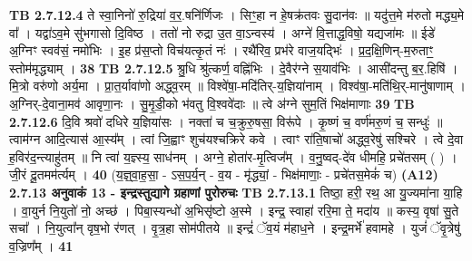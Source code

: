 \documentclass[17pt]{extarticle}
\begin{document}
{                  \newline
                                \textbf{ TB 2.7.12.4} \newline
                  ते स्वा॒निनो॑ रु॒द्रिया॑ व॒र॒.षनि॑र्णिजः । सिꣳ॒॒हा न हे॒षक्र॑तवः सु॒दान॑वः ॥ यदु॑त्त॒मे म॑रुतो मद्ध्य॒मे वा᳚ । यद्वा॑ऽव॒मे सु॑भगासो दि॒विष्ठ । ततो॑ नो रुद्रा उ॒त वा॒ऽन्वस्य॑ । अग्ने॑ वि॒त्ताद्ध॒विषो॒ यद्यजा॑मः ॥ ईडे॑ अ॒ग्निꣳ स्वव॑सं॒ नमो॑भिः । इ॒ह प्र॑स॒प्तो विच॑यत्कृ॒तं नः॑ । रथै॑रिव॒ प्रभ॑रे वाज॒यद्भिः॑ । प्र॒द॒क्षि॒णिन्-म॒रुताꣳ॒॒ स्तोम॑मृद्ध्याम् । \textbf{ 38} \newline
                  \newline
                                \textbf{ TB 2.7.12.5} \newline
                  श्रु॒धि श्रु॑त्कर्ण॒ वह्नि॑भिः । दे॒वैर॑ग्ने स॒याव॑भिः । आसी॑दन्तु ब॒र॒.हिषि॑ । मि॒त्रो वरु॑णो अर्य॒मा । प्रा॒त॒र्यावा॑णो अद्ध्व॒रम् ॥ विश्वे॑षा॒-मदि॑तिर्-य॒ज्ञिया॑नाम् । विश्व॑षा॒-मति॑थि॒र्-मानु॑षाणाम् । अ॒ग्निर्-दे॒वाना॒मव॑ आवृणा॒नः । सु॒मृ॒डी॒को भ॑वतु वि॒श्ववे॑दाः ॥ त्वे अ॑ग्ने सुम॒तिं भिक्ष॑माणाः \textbf{ 39} \newline
                  \newline
                                \textbf{ TB 2.7.12.6} \newline
                  दि॒वि श्रवो॑ दधिरे य॒ज्ञिया॑सः । नक्ता॑ च च॒क्रुरु॒षसा॒ विरू॑पे । कृ॒ष्णं च॒ वर्ण॑मरु॒णं च॒ सन्धुः॑ ॥ त्वाम॑ग्न आदि॒त्यास॑ आ॒स्य᳚म् । त्वां जि॒ह्वाꣳ शुच॑यश्चक्रिरे कवे । त्वाꣳ रा॑ति॒षाचो॑ अद्ध्व॒रेषु॑ सश्चिरे । त्वे दे॒वा ह॒विर॑द॒न्त्याहु॑तम् ॥ नि त्वा॑ य॒ज्ञ्स्य॒ साध॑नम् । अग्ने॒ होता॑र-मृ॒त्विज᳚म् । व॒नु॒ष्वद्-दे॑व धीमहि॒ प्रचे॑तसम् ( ) । जी॒रं दू॒तमम॑र्त्यम् । \textbf{ 40} \newline
                  \newline
                                    (य॒ज्ञ्॒वा॒ह॒सा॒ - ऽस॒प॒र्य॒न् - व॒य - मृ॑द्ध्यां॒ - भिक्ष॑माणाः॒ - प्रचे॑तस॒मेकं॑ च) \textbf{(A12)} \newline \newline
                \textbf{ 2.7.13     अनुवाकं   13 - इन्द्रस्तुद्यागे ग्रहाणां पुरोरुचः} \newline
                                \textbf{ TB 2.7.13.1} \newline
                  तिष्ठा॒ हरी॒ रथ॒ आ यु॒ज्यमा॑ना या॒हि । वा॒युर्न नि॒युतो॑ नो॒ अच्छ॑ । पिबा॒स्यन्धो॑ अ॒भिसृ॑ष्टो अ॒स्मे । इन्द्र॒ स्वाहा॑ ररि॒मा ते॒ मदा॑य ॥ कस्य॒ वृषा॑ सु॒ते सचा᳚ । नि॒युत्वा᳚न् वृष॒भो र॑णत् । वृ॒त्र॒हा सोम॑पीतये ॥ इन्द्रं॑ ॅव॒यं म॑हाध॒ने । इन्द्र॒मर्भे॑ हवामहे । युजं॑ ॅवृ॒त्रेषु॑ व॒ज्रिण᳚म् । \textbf{ 41} \newline
}
\end{document}
